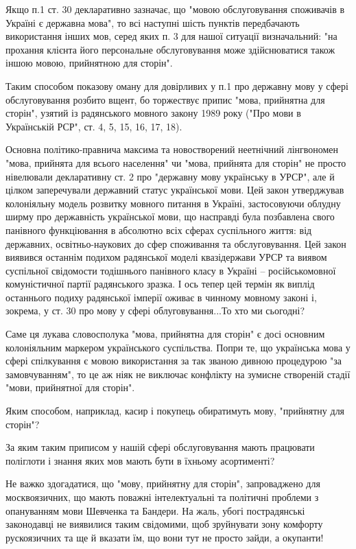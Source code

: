 Якщо п.1 ст. 30 декларативно зазначає, що "мовою обслуговування споживачів в
Україні є державна мова", то всі наступні шість пунктів передбачають
використання інших мов, серед яких п. 3 для нашої ситуації визначальний: "на
прохання клієнта його персональне обслуговування може здійснюватися також іншою
мовою, прийнятною для сторін".

Таким способом показову оману для довірливих у п.1 про державну мову у сфері
обслуговування розбито вщент, бо торжествує припис "мова, прийнятна для
сторін", узятий із радянського мовного закону 1989 року ("Про мови в
Українській РСР", ст. 4, 5, 15, 16, 17, 18).

Основна політико-правнича максима та новостворений неетнічний лінгвономен
"мова, прийнята для всього населення" чи "мова, прийнята для сторін" не просто
нівелювали декларативну ст. 2 про "державну мову українську в УРСР", але й
цілком заперечували державний статус української мови. Цей закон утверджував
колоніяльну модель розвитку мовного питання в Україні, застосовуючи облудну
ширму про державність української мови, що насправді була позбавлена свого
панівного функціювання в абсолютно всіх сферах суспільного життя: від
державних, освітньо-наукових до сфер споживання та обслуговування. Цей закон
виявився останнім подихом радянської моделі квазідержави УРСР та виявом
суспільної свідомости тодішнього панівного класу в Україні – російськомовної
комуністичної партії радянського зразка. І ось тепер цей термін як виплід
останнього подиху радянської імперії оживає в чинному мовному законі і,
зокрема, у ст. 30 про мову у сфері облуговування...То хто ми сьогодні?

Саме ця лукава словосполука "мова, прийнятна для сторін" є досі основним
колоніяльним маркером українського суспільства. Попри те, що українська мова у
сфері спілкування є мовою використання за так званою дивною процедурою "за
замовчуванням", то це аж ніяк не виключає конфлікту на зумисне створеній стадії
"мови, прийнятної для сторін".

Яким способом, наприклад, касир і покупець обиратимуть мову, "прийнятну для
сторін"?

За яким таким приписом у нашій сфері обслуговування мають працювати поліглоти і
знання яких мов мають бути в їхньому асортименті?

Не важко здогадатися, що "мову, прийнятну для сторін", запроваджено для
москвоязичних, що мають поважні інтелектуальні та політичні проблеми з
опануванням мови Шевченка та Бандери. На жаль, убогі пострадянські законодавці
не виявилися таким свідомими, щоб зруйнувати зону комфорту рускоязичних та ще й
вказати їм, що вони тут не просто зайди, а окупанти!

